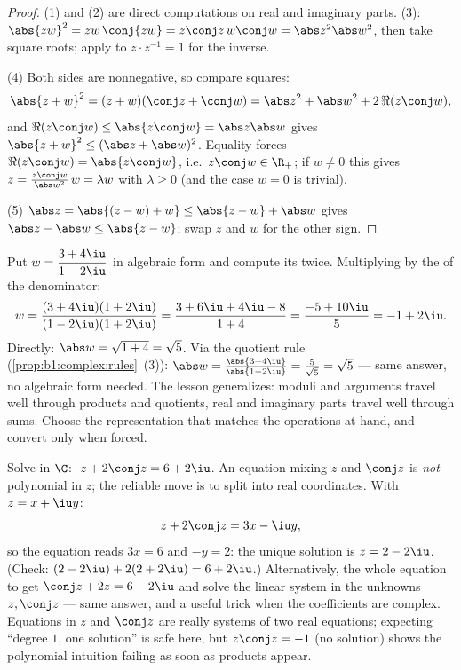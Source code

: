 \begin{proof}
(1) and (2) are direct computations on real and imaginary parts. (3):
$\abs{zw}^2 = zw\,\conj{zw} = z\conj z\, w \conj w = \abs z^2 \abs
w^2$, then take square roots; apply to $z \cdot z^{-1} = 1$ for the
inverse.

(4) Both sides are nonnegative, so compare squares:
\[
\abs{z+w}^2 = (z+w)(\conj z + \conj w)
= \abs z^2 + \abs w^2 + 2\,\Re(z \conj w),
\]
and $\Re(z\conj w) \leq \abs{z \conj w} = \abs z \abs w$ gives
$\abs{z+w}^2 \leq (\abs z + \abs w)^2$. Equality forces $\Re(z \conj
w) = \abs{z \conj w}$, i.e.\ $z \conj w \in \R_+$; if $w \neq 0$ this
gives $z = \frac{z\conj w}{\abs w^2}\, w = \lambda w$ with $\lambda
\geq 0$ (and the case $w = 0$ is trivial).

(5) $\abs z = \abs{(z - w) + w} \leq \abs{z-w} + \abs w$ gives $\abs z
- \abs w \leq \abs{z - w}$; swap $z$ and $w$ for the other sign.
\end{proof}

\begin{example}\label{ex:b1:complex:workout}
Put $w = \dfrac{3 + 4\iu}{1 - 2\iu}$ in algebraic form and compute
its  twice. Multiplying by the  of the
denominator:
\[
w = \frac{(3 + 4\iu)(1 + 2\iu)}{(1 - 2\iu)(1 + 2\iu)}
= \frac{3 + 6\iu + 4\iu - 8}{1 + 4}
= \frac{-5 + 10\iu}{5} = -1 + 2\iu .
\]
Directly: $\abs w = \sqrt{1 + 4} = \sqrt5$. Via the quotient rule
(\cref{prop:b1:complex:rules}~(3)): $\abs w = \frac{\abs{3 +
4\iu}}{\abs{1 - 2\iu}} = \frac5{\sqrt5} = \sqrt5$ --- same answer,
no algebraic form needed. The lesson generalizes: moduli and
arguments travel well through products and quotients, real and
imaginary parts travel well through sums. Choose the
representation that matches the operations at hand, and convert
only when forced.
\end{example}

\begin{example}\label{ex:b1:complex:conjeq}
Solve in $\C$: $\;z + 2\conj z = 6 + 2\iu$. An equation mixing $z$
and $\conj z$ is \emph{not} polynomial in $z$; the reliable move
is to split into real coordinates. With $z = x + \iu y$:
\[
z + 2\conj z = 3x - \iu y ,
\]
so the equation reads $3x = 6$ and $-y = 2$: the unique solution
is $z = 2 - 2\iu$. (Check: $(2 - 2\iu) + 2(2 + 2\iu) = 6 +
2\iu$.) Alternatively,  the whole equation to get
$\conj z + 2z = 6 - 2\iu$ and solve the linear system in the
unknowns $z, \conj z$ --- same answer, and a useful trick when
the coefficients are complex. Equations in $z$ and $\conj z$ are
really systems of two real equations; expecting ``degree $1$, one
solution'' is safe here, but $z\conj z = -1$ (no solution) shows
the polynomial intuition failing as soon as products appear.
\end{example}

